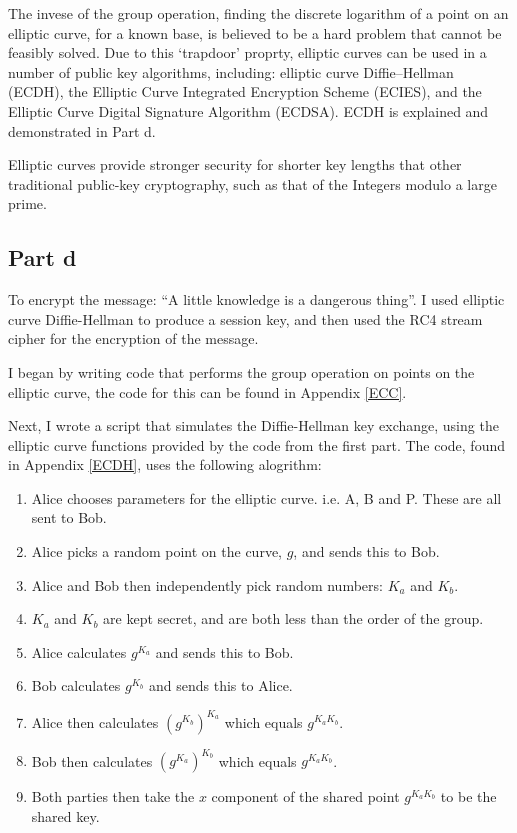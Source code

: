 \documentclass[11pt,a4paper,twoside]{article}
\begin{document}
The invese of the group operation, finding the discrete logarithm of a point on
an elliptic curve, for a known base, is believed to be a hard problem that
cannot be feasibly solved. Due to this `trapdoor' proprty, elliptic curves can
be used in a number of public key algorithms, including: elliptic curve
Diffie–Hellman (ECDH), the Elliptic Curve Integrated Encryption Scheme (ECIES),
and the Elliptic Curve Digital Signature Algorithm (ECDSA). ECDH is explained
and demonstrated in Part d.

Elliptic curves provide stronger security for shorter key lengths that other
traditional public-key cryptography, such as that of the Integers modulo a
large prime. 

\subsection{Part d}
To encrypt the message: “A little knowledge is a dangerous thing”. I used
elliptic curve Diffie-Hellman to produce a session key, and then used the RC4
stream cipher for the encryption of the message. 

I began by writing code that performs the group operation on points on the
elliptic curve, the code for this can be found in Appendix \ref{ECC}.  

Next, I wrote a script that simulates the Diffie-Hellman key exchange, using
the elliptic curve functions provided by the code from the first part. The
code, found in Appendix \ref{ECDH}, uses the following alogrithm:

\begin{enumerate}[noitemsep]
\item Alice chooses parameters for the elliptic curve. i.e. A, B and P. These are all sent to Bob.
\item Alice picks a random point on the curve, $g$, and sends this to Bob.
\item Alice and Bob then independently pick random numbers: $K_{a}$ and $K_{b}$. 
\item $K_{a}$ and $K_{b}$ are kept secret, and are both less than the order of the group. 
\item Alice calculates $g^{K_{a}}$ and sends this to Bob.
\item Bob calculates $g^{K_{b}}$ and sends this to Alice. 
\item Alice then calculates $(g^{K_{b}})^{K_{a}}$ which equals $g^{K_{a}K_{b}}$.
\item Bob then calculates $(g^{K_{a}})^{K_{b}}$ which equals $g^{K_{a}K_{b}}$.
\item Both parties then take the $x$ component of the shared point $g^{K_{a}K_{b}}$ to be the shared key.
\end{enumerate}
\end{document}
